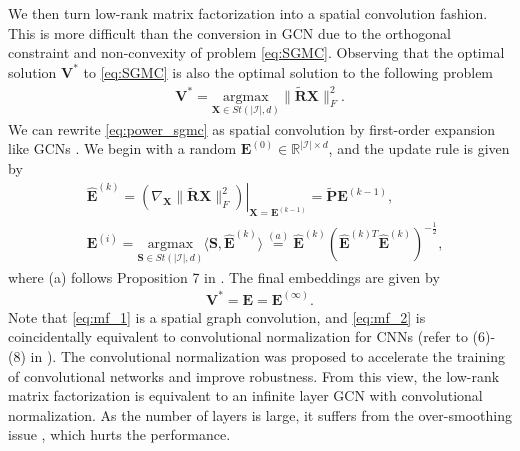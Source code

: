 \documentclass[sigconf]{acmart}
\newcommand\at[2]{\left.#1\right|_{#2}}
\begin{document}
We then turn low-rank matrix factorization into a spatial convolution fashion. This is more difficult than the conversion in GCN \cite{kipf2016semi} due to the orthogonal constraint and non-convexity of problem \eqref{eq:SGMC}. Observing that the optimal solution $\bm{V}^*$ to \eqref{eq:SGMC} is also the optimal solution to the following problem 
\begin{align} \label{eq:power_sgmc}
    \bm{V}^* = \underset{\bm{X} \in St(|\mathcal{I}|, d)}{\text{argmax}}  \| \tilde{\bm{R}}\bm{X}\|_F^2.
\end{align}
We can rewrite \eqref{eq:power_sgmc} as spatial convolution by first-order expansion like GCNs \cite{kipf2016semi}. We begin with a random $\bm{E}^{(0)} \in \mathbb{R}^{|\mathcal{I}|\times d}$, and the update rule is given by 
\begin{align}
    & \hat{\bm{E}}^{(k)} = \at{\left(\nabla_{\bm{X}} \| \tilde{\bm{R}}\bm{X}\|_F^2\right)}{\bm{X} = \bm{E}^{(k-1)}} = \tilde{\bm{P}} \bm{E}^{(k-1)}, \label{eq:mf_1}\\
    &\bm{E}^{(i)} = \underset{\bm{S} \in St(|\mathcal{I}|,d)}{\text{argmax} } \langle \bm{S}, \hat{\bm{E}}^{(k)}  \rangle \overset{(a)}{=}  \hat{\bm{E}}^{(k)} \left(\hat{\bm{E}}^{(k)T}\hat{\bm{E}}^{(k)}  \right)^{-\frac{1}{2}} \label{eq:mf_2},
\end{align}
where (a) follows Proposition 7 in \cite{journee2010generalized}. The final embeddings are given by 
\begin{align*}
    \bm{V}^* = \bm{E} = \bm{E}^{(\infty)}.
\end{align*}
Note that \eqref{eq:mf_1} is a spatial graph convolution, and \eqref{eq:mf_2} is coincidentally equivalent to convolutional normalization for CNNs \cite{liu2021convolutional} (refer to (6)-(8) in \cite{liu2021convolutional}). The convolutional normalization was proposed to accelerate the training of convolutional networks and improve robustness. From this view, the low-rank matrix factorization is equivalent to an infinite layer GCN with convolutional normalization. As the number of layers is large, it suffers from the over-smoothing issue \cite{li2018deeper}, which hurts the performance.
\end{document}
